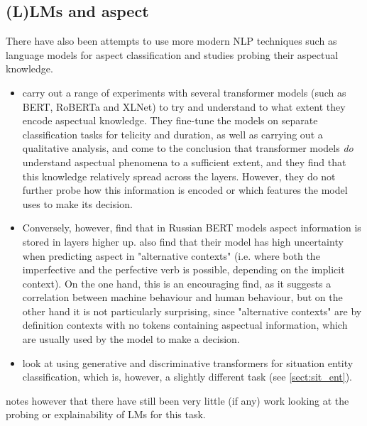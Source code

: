 \subsection{(L)LMs and aspect}
There have also been attempts to use more modern NLP techniques such as language models for aspect classification and studies probing their aspectual knowledge.
\begin{itemize}
    \item \citet{metheniti-etal-2022-time} carry out a range of experiments with several transformer models (such as BERT, RoBERTa and XLNet) to try and understand to what extent they encode aspectual knowledge. They fine-tune the models on separate classification tasks for telicity and duration, as well as carrying out a qualitative analysis, and come to the conclusion that transformer models \emph{do} understand aspectual phenomena to a sufficient extent, and they find that this knowledge relatively spread across the layers. However, they do not further probe how this information is encoded or which features the model uses to make its decision.
    \item Conversely, however, \citet{katinskaia2024probing} find that in Russian BERT models \citep{kuratov2019adaptation} aspect information is stored in layers higher up. \citet{katinskaia2024probing} also find that their model has high uncertainty when predicting aspect in "alternative contexts" (i.e. where both the imperfective and the perfective verb is possible, depending on the implicit context). On the one hand, this is an encouraging find, as it suggests a correlation between machine behaviour and human behaviour, but on the other hand it is not particularly surprising, since "alternative contexts" are by definition contexts with no tokens containing aspectual information, which are usually used by the model to make a decision. 
    \item \citet{rezaee2021discriminative} look at using generative and discriminative transformers for situation entity classification, which is, however, a slightly different task (see \ref{sect:sit_ent}).
\end{itemize}

\citet{friedrich-etal-2023-kind} notes however that there have still been very little (if any) work looking at the probing or explainability of LMs for this task.

